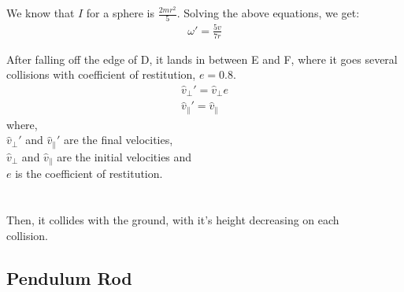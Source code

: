 \documentclass[11pt]{article}
\begin{document}
We know that $I$ for a sphere is $\frac{2mr^2}{5}$.
Solving the above equations, we get:
\begin{align}
\omega ' = \frac{5v}{7r}
\end{align}

\pagebreak

After falling off the edge of D, it lands in between E and F, where it goes several collisions with coefficient of restitution, $e = 0.8$. \cite{halliday}
\begin{align}
\hat{v}_{\perp} ' = \hat{v}_{\perp}e
\\
\hat{v}_{\parallel} ' = \hat{v}_{\parallel}
\end{align}
where,\\
$\hat{v}_{\perp} '$ and $\hat{v}_{\parallel} '$ are the final velocities,\\
$\hat{v}_{\perp}$ and $\hat{v}_{\parallel}$ are the initial velocities and\\
$e$ is the coefficient of restitution.
\\
\\
\setlength\fboxsep{2pt}
\setlength\fboxrule{1pt}
\\

Then, it collides with the ground, with it's height decreasing on each \\ collision.

\pagebreak

\subsection{Pendulum Rod}
\end{document}
